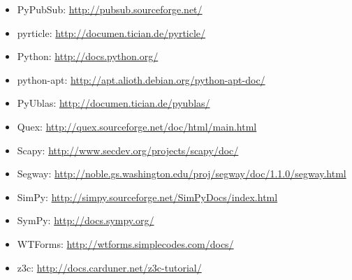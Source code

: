 \documentclass[letterpaper,10pt,english]{sphinxmanual}
\begin{document}
\begin{itemize}
\item {} 
PyPubSub: \url{http://pubsub.sourceforge.net/}

\item {} 
pyrticle: \url{http://documen.tician.de/pyrticle/}

\item {} 
Python: \url{http://docs.python.org/}

\item {} 
python-apt: \url{http://apt.alioth.debian.org/python-apt-doc/}

\item {} 
PyUblas: \url{http://documen.tician.de/pyublas/}

\item {} 
Quex: \url{http://quex.sourceforge.net/doc/html/main.html}

\item {} 
Scapy: \url{http://www.secdev.org/projects/scapy/doc/}

\item {} 
Segway:
\url{http://noble.gs.washington.edu/proj/segway/doc/1.1.0/segway.html}

\item {} 
SimPy: \url{http://simpy.sourceforge.net/SimPyDocs/index.html}

\item {} 
SymPy: \url{http://docs.sympy.org/}

\item {} 
WTForms: \url{http://wtforms.simplecodes.com/docs/}

\item {} 
z3c: \url{http://docs.carduner.net/z3c-tutorial/}

\end{itemize}
\end{document}
